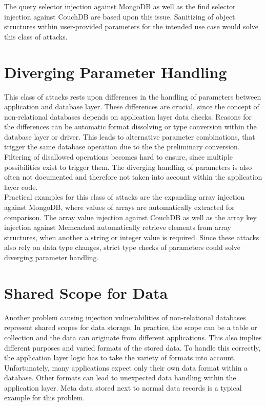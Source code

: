 The query selector injection against MongoDB as well as the find selector injection against CouchDB are based upon this issue. Sanitizing of object structures within user-provided parameters for the intended use case would solve this class of attacks.

\section{Diverging Parameter Handling}
This class of attacks rests upon differences in the handling of parameters between application and database layer. These differences are crucial, since the concept of non-relational databases depends on application layer data checks. Reasons for the differences can be automatic format dissolving or type conversion within the database layer or driver. This leads to alternative parameter combinations, that trigger the same database operation due to the the preliminary conversion. Filtering of disallowed operations becomes hard to ensure, since multiple possibilities exist to trigger them. The diverging handling of parameters is also often not documented and therefore not taken into account within the application layer code. \\ 

Practical examples for this class of attacks are the expanding array injection against MongoDB, where values of arrays are automatically extracted for comparison. The array value injection against CouchDB as well as the array key injection against Memcached automatically retrieve elements from array structures, when another a string or integer value is required. Since these attacks also rely on data type changes, strict type checks of parameters could solve diverging parameter handling.

\section{Shared Scope for Data}

Another problem causing injection vulnerabilities of non-relational databases represent shared scopes for data storage. In practice, the scope can be a table or collection and the data can originate from different applications. This also implies different purposes and varied formats of the stored data. To handle this correctly, the application layer logic has to take the variety of formats into account. Unfortunately, many applications expect only their own data format within a database. Other formats can lead to unexpected data handling within the application layer. Meta data stored next to normal data records is a typical example for this problem. \\

